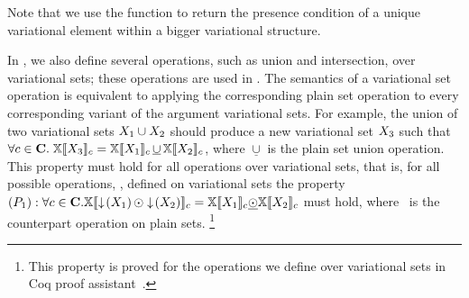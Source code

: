 Note that we use the function \getPCfrom \elem {\annot \vset} to 
return the presence condition of a unique variational element within a bigger
variational structure. 

In , we also define several operations, such as union and
intersection, over variational sets; these operations are used in . The
semantics of a variational set operation is equivalent to applying the corresponding
plain set operation to every corresponding variant of the argument variational sets. For
example, the union of two variational sets $\vset_1\cup\vset_2$ should produce a new
variational set $\vset_3$ such that
%
$\forall c\in\confSet.\;
\osetSem{\vset_3} = \osetSem{\vset_1}\,\underline{\cup}\,\osetSem{\vset_2}$,
where $\underline{\cup}$ is the plain set union operation.
%
 This property must hold for all operations over variational sets, that is, for all possible operations, \vsetOp, defined on variational sets the property 
 \ensuremath{
 \Pone: 
 \forall \config \in \confSet. \osetSem {\pushIn {\vset_1} \vsetOp \pushIn {\vset_2}} 
 = \osetSem {\vset_1} \psetOp \osetSem {\vset_2}
 } must hold, where \psetOp\ is the counterpart operation on plain sets.%
\footnote{This property is proved for the operations we define over variational sets in Coq proof assistant~\cite{Khan21}.}

